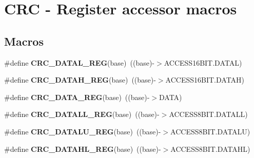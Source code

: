 \hypertarget{group__CRC__Register__Accessor__Macros}{}\section{C\+RC -\/ Register accessor macros}
\label{group__CRC__Register__Accessor__Macros}
\subsection*{Macros}
\begin{DoxyCompactItemize}
\item 
\#define {\bfseries C\+R\+C\+\_\+\+D\+A\+T\+A\+L\+\_\+\+R\+EG}(base)~((base)-\/$>$A\+C\+C\+E\+S\+S16\+B\+I\+T.\+D\+A\+T\+AL)\hypertarget{group__CRC__Register__Accessor__Macros_ga54f4e08c650fbcfdda8439fcff3cc0d0}{}\label{group__CRC__Register__Accessor__Macros_ga54f4e08c650fbcfdda8439fcff3cc0d0}

\item 
\#define {\bfseries C\+R\+C\+\_\+\+D\+A\+T\+A\+H\+\_\+\+R\+EG}(base)~((base)-\/$>$A\+C\+C\+E\+S\+S16\+B\+I\+T.\+D\+A\+T\+AH)\hypertarget{group__CRC__Register__Accessor__Macros_ga890c16e0618372d6a3a9b1aa97eff39c}{}\label{group__CRC__Register__Accessor__Macros_ga890c16e0618372d6a3a9b1aa97eff39c}

\item 
\#define {\bfseries C\+R\+C\+\_\+\+D\+A\+T\+A\+\_\+\+R\+EG}(base)~((base)-\/$>$D\+A\+TA)\hypertarget{group__CRC__Register__Accessor__Macros_ga17e6745c67535b0f48a64c0331f44e86}{}\label{group__CRC__Register__Accessor__Macros_ga17e6745c67535b0f48a64c0331f44e86}

\item 
\#define {\bfseries C\+R\+C\+\_\+\+D\+A\+T\+A\+L\+L\+\_\+\+R\+EG}(base)~((base)-\/$>$A\+C\+C\+E\+S\+S8\+B\+I\+T.\+D\+A\+T\+A\+LL)\hypertarget{group__CRC__Register__Accessor__Macros_ga2e802356d547513cc167cbfc74360a88}{}\label{group__CRC__Register__Accessor__Macros_ga2e802356d547513cc167cbfc74360a88}

\item 
\#define {\bfseries C\+R\+C\+\_\+\+D\+A\+T\+A\+L\+U\+\_\+\+R\+EG}(base)~((base)-\/$>$A\+C\+C\+E\+S\+S8\+B\+I\+T.\+D\+A\+T\+A\+LU)\hypertarget{group__CRC__Register__Accessor__Macros_ga7d345ba407c8f141876983d3d682e60e}{}\label{group__CRC__Register__Accessor__Macros_ga7d345ba407c8f141876983d3d682e60e}

\item 
\#define {\bfseries C\+R\+C\+\_\+\+D\+A\+T\+A\+H\+L\+\_\+\+R\+EG}(base)~((base)-\/$>$A\+C\+C\+E\+S\+S8\+B\+I\+T.\+D\+A\+T\+A\+HL)\hypertarget{group__CRC__Register__Accessor__Macros_ga4e248bcf436029f7e5d8e51be0d09197}{}\label{group__CRC__Register__Accessor__Macros_ga4e248bcf436029f7e5d8e51be0d09197}


\end{DoxyCompactItemize}

